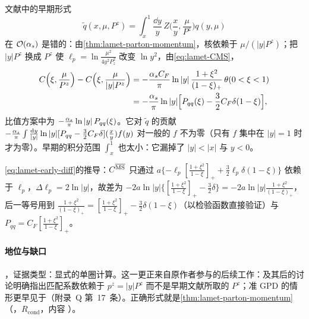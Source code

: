 \begin{remark}\label{rem:lamet-early-form}
文献\cite[式~(11)]{Ji2013}中的早期形式
\[
\tilde q(x,\mu,P^z)=\int_x^1\frac{\dd y}y\,Z\Big(\frac xy,\frac\mu{P^z}\Big)q(y,\mu)
\]
在 $\mathcal{O}\!\left(\alpha_s\right)$ 是错的：由\cref{thm:lamet-parton-momentum}，核依赖于 $\mu/(|y|P^z)$；把 $|y|P^z$ 换成 $P^z$ 使 $\ell_p=\ln\frac{\mu^2}{4y^2P_z^2}$ 改变 $\ln y^2$，由\cref{eq:lamet-CMS}，
\begin{equation}\label{eq:lamet-early-diff}
\begin{split}
C\Big(\xi,\frac\mu{P^z}\Big)-C\Big(\xi,\frac\mu{|y|P^z}\Big)&=-\frac{\alpha_s C_F}\pi\ln|y|\,\frac{1+\xi^2}{(1-\xi)_+}\,\theta(0<\xi<1)\\
&=-\frac{\alpha_s}\pi\ln|y|\Big[P_{qq}(\xi)-\frac32C_F\delta(1-\xi)\Big],
\end{split}
\end{equation}%
比值方案中为 $-\frac{\alpha_s}\pi\ln|y|\,P_{qq}(\xi)$。它对 $\tilde q$ 的贡献 $-\frac{\alpha_s}\pi\int\frac{\mathrm{d} y}{|y|}\ln|y|[P_{qq}-\frac32C_F\delta](\frac xy)f(y)$ 对一般的 $f$ 不为零（只有 $f$ 集中在 $|y|=1$ 时才为零）。早期的积分范围 $\int_x^1$ 也太小：它漏掉了 $|y|<|x|$ 与 $y<0$。
\end{remark}

\cref{eq:lamet-early-diff}的推导：$C^{\overline{\mathrm{MS}}}$ 只通过 $a\{-\ell_p[\frac{1+\xi^2}{1-\xi}]_++\frac32\ell_p\delta(1-\xi)\}$ 依赖于 $\ell_p$，$\Delta\ell_p=2\ln|y|$，故差为 $-2a\ln|y|\{[\frac{1+\xi^2}{1-\xi}]_+-\frac32\delta\}=-2a\ln|y|\frac{1+\xi^2}{(1-\xi)_+}$，后一等号用到 $\frac{1+\xi^2}{(1-\xi)_+}=[\frac{1+\xi^2}{1-\xi}]_+-\frac32\delta(1-\xi)$（以检验函数直接验证）与 $P_{qq}=C_F[\frac{1+\xi^2}{1-\xi}]_+$。

\paragraph{地位与缺口}
\tagV，证据类型：显式的单圈计算\cite{IzubuchiEtAl2018}。这一更正来自原作者参与的后续工作：\cite[式~(27)]{IzubuchiEtAl2018}及其后的讨论明确指出匹配系数依赖于 $p^z=|y|P^z$ 而不是早期文献所取的 $P^z$；准 GPD 的情形更早见于\cite{Ji:2015qla}（附录~Q 第~17~条）。正确形式就是\cref{thm:lamet-parton-momentum}（\tagR，$R_{\mathrm{cond}}$，内容 \tagA）。

